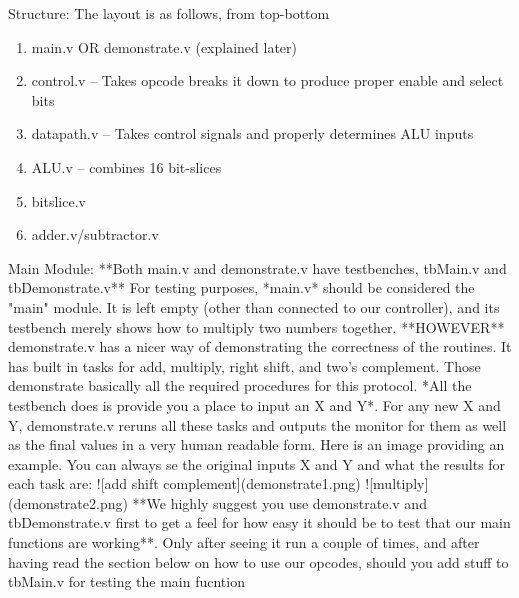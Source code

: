 \documentclass[12pt]{article}
\begin{document}
Structure:
\newline \newline
The layout is as follows, from top-bottom
\begin{enumerate}
	\item main.v OR demonstrate.v (explained later)
	\item control.v -- Takes opcode breaks it down to produce proper enable and select bits
	\item datapath.v -- Takes control signals and properly determines ALU inputs
	\item ALU.v -- combines 16 bit-slices
	\item bitslice.v
	\item adder.v/subtractor.v
\end{enumerate}
Main Module:
\newline \newline
**Both main.v and demonstrate.v have testbenches, tbMain.v and tbDemonstrate.v** 
\newline \newline
For testing purposes, *main.v* should be considered the "main" module. It is left empty (other than connected to our controller), and its testbench merely shows how to multiply two numbers together.
\newline \newline
**HOWEVER**
\newline \newline
demonstrate.v has a nicer way of demonstrating the correctness of the routines. It has built in tasks for add, multiply, right shift, and two's complement. Those demonstrate basically all the required procedures for this protocol. *All the testbench does is provide you a place to input an X and Y*. For any new X and Y, demonstrate.v reruns all these tasks and outputs the monitor for them as well as the final values in a very human readable form.  Here is an image providing an example. You can always se the original inputs X and Y and what the results for each task are:
![add shift complement](demonstrate1.png)
![multiply](demonstrate2.png)
\newline \newline
**We highly suggest you use demonstrate.v and tbDemonstrate.v first to get a feel for how easy it should be to test that our main functions are working**. 
Only after seeing it run a couple of times, and after having read the section below on how to use our opcodes, should you add stuff to tbMain.v for testing the main fucntion
\newline \newline
\end{document}

